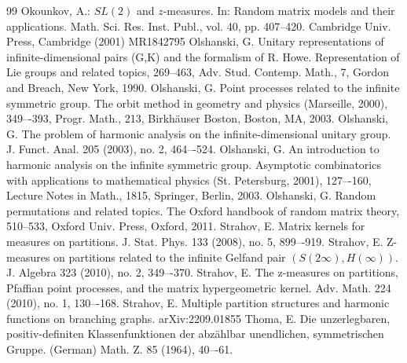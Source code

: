 \documentclass[12pt]{amsart}
\theoremstyle{definition}
\numberwithin{equation}{section}
\begin{document}
\begin{thebibliography}{99}
Okounkov, A.: $SL(2)$ and $z$-measures. In: Random matrix models and their applications. Math. Sci. Res. Inst. Publ., vol. 40, pp. 407–420. Cambridge Univ. Press, Cambridge (2001) MR1842795
 Olshanski, G. Unitary representations of infinite-dimensional pairs (G,K) and the formalism of R. Howe. Representation of Lie groups and related topics, 269–463, Adv. Stud. Contemp. Math., 7, Gordon and Breach, New York, 1990.
 Olshanski, G. Point processes related to the infinite symmetric group. The orbit method in geometry and physics (Marseille, 2000), 349–-393, Progr. Math., 213, Birkhäuser Boston, Boston, MA, 2003.
 Olshanski, G. The problem of harmonic analysis on the infinite-dimensional unitary group. J. Funct. Anal. 205 (2003), no. 2, 464–-524.
  Olshanski, G. An introduction to harmonic analysis on the infinite symmetric group. Asymptotic combinatorics with applications to mathematical physics (St. Petersburg, 2001), 127–-160, Lecture Notes in Math., 1815, Springer, Berlin, 2003.
   Olshanski, G. Random permutations and related topics. The Oxford handbook of random matrix theory, 510–533, Oxford Univ. Press, Oxford, 2011.
   Strahov, E. Matrix kernels for measures on partitions. J. Stat. Phys. 133 (2008), no. 5, 899–-919.
Strahov, E. Z-measures on partitions related to the infinite Gelfand pair $(S(2\infty),H(\infty))$. J. Algebra 323 (2010), no. 2, 349–-370.
 Strahov, E. The z-measures on partitions, Pfaffian point processes, and the matrix hypergeometric kernel. Adv. Math. 224 (2010), no. 1, 130–-168.
 Strahov, E. Multiple partition structures and harmonic functions on branching graphs.
 arXiv:2209.01855
Thoma, E. Die unzerlegbaren, positiv-definiten Klassenfunktionen der abzählbar unendlichen, symmetrischen Gruppe. (German) Math. Z. 85 (1964), 40–-61.

\end{thebibliography}
\end{document}
